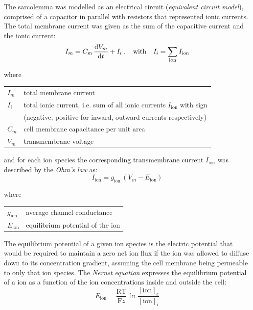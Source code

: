 \vspace{0.2cm}
The sarcolemma was modelled as an electrical circuit (\textit{equivalent circuit model}), comprised of a capacitor in parallel with resistors that represented ionic currents. The total membrane current was given as the sum of the capacitive current and the ionic current:
%
\begin{equation}\label{eq:membranecurrent}
I_m = C_m\,\dfrac{\mathrm{d}{V_m}}{\mathrm{d}{t}} + I_i\,,\quad\text{with}\quad I_i = \sum_{\textrm{ion}}I_\textrm{ion}
\end{equation}

\noindent
where

\vspace{0.2cm}
\begin{tabular}{ll}
    $I_m$            & total membrane current \\
    $I_i$            & total ionic current, i.e. sum of all ionic currents $I_\textrm{ion}$ with sign \\
    & (negative, positive for inward, outward currents respectively) \\ 
    $C_m$            & cell membrane capacitance per unit area \\
    $V_m$            & transmembrane voltage
\end{tabular}

\vspace{0.2cm}\noindent
and for each ion species the corresponding transmembrane current $I_{\textrm{ion}}$ was described by the \textit{Ohm's law} as:
%
\begin{equation}\label{eq:ohmslawsinglechannel}
    I_{\textrm{ion}} = g_{\textrm{ion}}\,(V_m-E_{\textrm{ion}})
\end{equation}

\noindent
where

\vspace{0.2cm}
\begin{tabular}{ll}
    $g_{\textrm{ion}}$ & average channel conductance \\
    $E_\textrm{ion}$ & equilibrium potential of the ion
\end{tabular}

\vspace{0.2cm}\noindent
The equilibrium potential of a given ion species is the electric potential that would be required to maintain a zero net ion flux if the ion was allowed to diffuse down to its concentration gradient, assuming the cell membrane being permeable to only that ion species. The \textit{Nernst equation} expresses the equilibrium potential of a ion as a function of the ion concentrations inside and outside the cell:
%
\begin{equation}
    E_{\textrm{ion}}=\frac{\textrm{R}\textrm{T}}{\textrm{F}z}\,\ln{\frac{[\textrm{ion}]_{e}}{[\textrm{ion}]_{i}}}
\end{equation}


